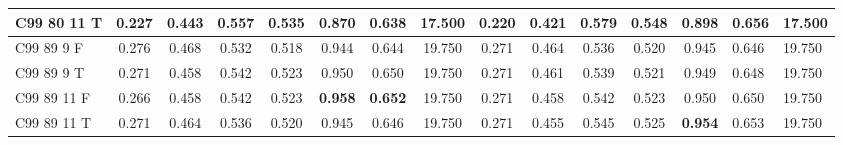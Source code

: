 \documentclass{article}
\begin{document}
\begin{longtable}[c]{|l|c|c|c|c|c|c||c|c|c|c|c|c|}
C99 80 11 T & 0.227 & 0.443 & 0.557 & 0.535 & 0.870 & 0.638 & 17.500 & 0.220 & 0.421 & 0.579 & 0.548 & 0.898 & \textbf{0.656} & 17.500\\ \hline
C99 89  9 F & 0.276 & 0.468 & 0.532 & 0.518 & 0.944 & 0.644 & 19.750 & 0.271 & 0.464 & 0.536 & 0.520 & 0.945 & 0.646 & 19.750\\ \hline
C99 89  9 T & 0.271 & 0.458 & 0.542 & 0.523 & 0.950 & 0.650 & 19.750 & 0.271 & 0.461 & 0.539 & 0.521 & 0.949 & 0.648 & 19.750\\ \hline
C99 89 11 F & 0.266 & 0.458 & 0.542 & 0.523 & \textbf{0.958} & \textbf{0.652} & 19.750 & 0.271 & 0.458 & 0.542 & 0.523 & 0.950 & 0.650 & 19.750\\ \hline
C99 89 11 T & 0.271 & 0.464 & 0.536 & 0.520 & 0.945 & 0.646 & 19.750 & 0.271 & 0.455 & 0.545 & 0.525 & \textbf{0.954} & 0.653 & 19.750\\ \hline
\end{longtable} 
\end{document}

